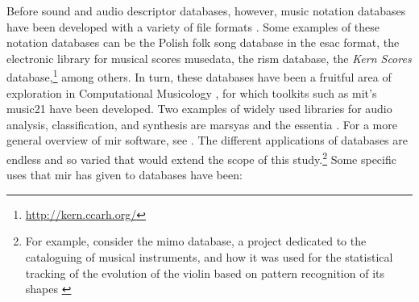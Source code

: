 Before sound and audio descriptor databases, however, music notation databases have been developed with a variety of file formats . Some examples of these notation databases can be the Polish folk song database in the \gls{esac} format, the electronic library for musical scores \gls{musedata}, the \gls{rism} database, the \textit{Kern Scores} database,\footnote{\url{http://kern.ccarh.org/}} among others. In turn, these databases have been a fruitful area of exploration in Computational Musicology \parencite{DBLP:conf/iciso/Yokl11}, for which toolkits such as \gls{mit}'s \gls{music21} have been developed. Two examples of widely used libraries for audio analysis, classification, and synthesis are \gls{marsyas} \parencite{tzanetakis_cook_2000} and the \gls{essentia} \parencite{DBLP:conf/ismir/BogdanovWGGHMRSZS13}. For a more general overview of \gls{mir} software, see \parencite{DBLP:conf/ismir/BogdanovWGGHMRSZS13}. The different applications of databases are endless and so varied that would extend the scope of this study.\footnote{For example, consider the \gls{mimo} database, a project dedicated to the cataloguing of musical instruments, and how it was used for the statistical tracking of the evolution of the violin based on pattern recognition of its shapes \parencite{2018arXiv180802848P}} Some specific uses that \gls{mir} has given to databases have been:

